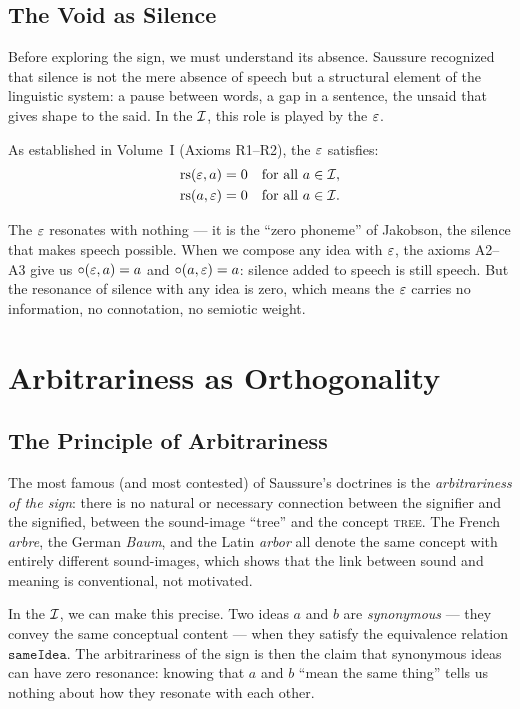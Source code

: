 \subsection{The Void as Silence}

Before exploring the sign, we must understand its absence. Saussure
recognized that silence is not the mere absence of speech but a
structural element of the linguistic system: a pause between words, a
gap in a sentence, the unsaid that gives shape to the said. In the
$\mathcal{I}$, this role is played by the $\varepsilon$.

As established in Volume~I (Axioms R1--R2), the $\varepsilon$ satisfies:
\begin{align}
  \mathrm{rs}(\varepsilon, a) &= 0 \quad \text{for all } a \in \mathcal{I}, \label{eq:void-left} \\
  \mathrm{rs}(a, \varepsilon) &= 0 \quad \text{for all } a \in \mathcal{I}. \label{eq:void-right}
\end{align}

The $\varepsilon$ resonates with nothing --- it is the ``zero phoneme'' of
Jakobson, the silence that makes speech possible. When we compose
any idea with $\varepsilon$, the axioms A2--A3 give us
$\circ(\varepsilon, a) = a$ and $\circ(a, \varepsilon) = a$: silence
added to speech is still speech. But the resonance of silence with
any idea is zero, which means the $\varepsilon$ carries no information, no
connotation, no semiotic weight.

\section{Arbitrariness as Orthogonality}

\subsection{The Principle of Arbitrariness}

The most famous (and most contested) of Saussure's doctrines is the
\emph{arbitrariness of the sign}: there is no natural or necessary
connection between the signifier and the signified, between the
sound-image ``tree'' and the concept \textsc{tree}. The French
\textit{arbre}, the German \textit{Baum}, and the Latin \textit{arbor}
all denote the same concept with entirely different sound-images, which
shows that the link between sound and meaning is conventional, not
motivated.

In the $\mathcal{I}$, we can make this precise. Two ideas $a$ and $b$ are
\emph{synonymous} --- they convey the same conceptual content --- when
they satisfy the equivalence relation $\texttt{sameIdea}$. The
arbitrariness of the sign is then the claim that synonymous ideas can
have zero resonance: knowing that $a$ and $b$ ``mean the same thing''
tells us nothing about how they resonate with each other.

